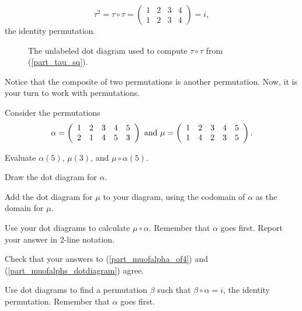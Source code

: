 \begin{exam}
\begin{apart}
\begin{soln}
                        $$\tau^2=\tau \circ \tau = \left ( \begin{array} {cccc} 1 & 2 & 3 & 4 \\ 1 & 2 & 3 & 4 \end{array} \right ) = i,$$
                       the identity permutation.
                    \begin{figure}[hbtp]
                        \centering
                        
                        \caption{The unlabeled dot diagram used to compute $\tau \circ \tau$ from  (\ref{part_tau_sq}).}
                        \label{fig_tau_sq}
                    \end{figure}
                    \end{soln}
            \end{apart}
\end{exam}

Notice that the composite of two permutations is another permutation.
Now, it is your turn to work with permutations.

\begin{act}[Permutations]
\label{act_perms}
    Consider the permutations 
        $$\alpha = \left ( \begin{array} {ccc cc} 1 & 2 & 3 & 4 & 5  \\ 2 & 1 & 4 & 5 & 3 \end{array} \right )\text{ and }\mu=  \left ( \begin{array} {ccc cc} 1 & 2 & 3 & 4 & 5  \\ 1 & 4 & 2 & 3 & 5 \end{array} \right ).$$
        \begin{actpart}
            \item \label{part_muofalpha_of4} Evaluate $\alpha(5)$, $\mu(3)$, and $\mu \circ \alpha(5)$.
            \item Draw the dot diagram for $\alpha$.  
            \item Add the dot diagram for $\mu$ to your diagram, using the codomain of $\alpha$ as the domain for $\mu$.
            \item \label{part_muofalphs_dotdiagram} Use your dot diagrams to calculate $\mu \circ \alpha$. Remember that $\alpha$ goes first. Report your answer in 2-line notation.
            \item Check that your answers to (\ref{part_muofalpha_of4}) and (\ref{part_muofalphs_dotdiagram}) agree. 
            \item \label{part_inv_perm} Use dot diagrams to find a permutation $\beta$ such that $\beta \circ \alpha= i$, the identity permutation.  Remember that $\alpha$ goes first. 
    \end{actpart}
\end{act}

